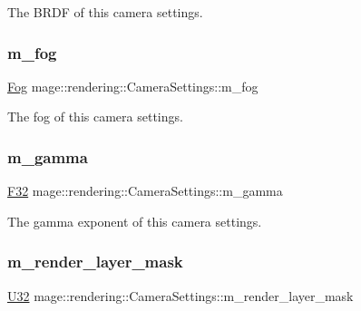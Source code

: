 The B\+R\+DF of this camera settings. \hypertarget{classmage_1_1rendering_1_1_camera_settings_a173329d1022c717efe29e33eaa554d18}{}\label{classmage_1_1rendering_1_1_camera_settings_a173329d1022c717efe29e33eaa554d18} 
\subsubsection{\texorpdfstring{m\+\_\+fog}{m\_fog}}
{\footnotesize\ttfamily \hyperlink{classmage_1_1rendering_1_1_fog}{Fog} mage\+::rendering\+::\+Camera\+Settings\+::m\+\_\+fog\hspace{0.3cm}{\ttfamily [private]}}

The fog of this camera settings. \hypertarget{classmage_1_1rendering_1_1_camera_settings_aec2e610b98b3657f49944a59c4717bee}{}\label{classmage_1_1rendering_1_1_camera_settings_aec2e610b98b3657f49944a59c4717bee} 
\subsubsection{\texorpdfstring{m\+\_\+gamma}{m\_gamma}}
{\footnotesize\ttfamily \hyperlink{namespacemage_aa97e833b45f06d60a0a9c4fc22ae02c0}{F32} mage\+::rendering\+::\+Camera\+Settings\+::m\+\_\+gamma\hspace{0.3cm}{\ttfamily [private]}}

The gamma exponent of this camera settings. \hypertarget{classmage_1_1rendering_1_1_camera_settings_ab6d4995fe7531563c5c5c8db1a0a1c9f}{}\label{classmage_1_1rendering_1_1_camera_settings_ab6d4995fe7531563c5c5c8db1a0a1c9f} 
\subsubsection{\texorpdfstring{m\+\_\+render\+\_\+layer\+\_\+mask}{m\_render\_layer\_mask}}
{\footnotesize\ttfamily \hyperlink{namespacemage_a41c104c036fba3756a74e19f793eeaa1}{U32} mage\+::rendering\+::\+Camera\+Settings\+::m\+\_\+render\+\_\+layer\+\_\+mask\hspace{0.3cm}{\ttfamily [private]}}

